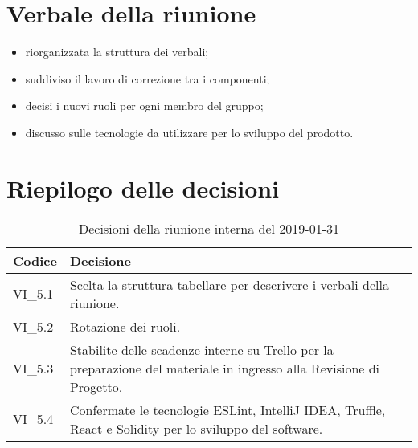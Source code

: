 \section{Verbale della riunione}
\begin{itemize}
	\item riorganizzata la struttura dei verbali;
	\item suddiviso il lavoro di correzione tra i componenti;
	\item decisi i nuovi ruoli per ogni membro del gruppo;
	\item discusso sulle tecnologie da utilizzare per lo sviluppo del prodotto.
\end{itemize}

\hspace{3cm}

\section{Riepilogo delle decisioni}

	
	\begin{longtable}{ >{\centering}p{} >{}p{}}
		\caption{Decisioni della riunione interna del 2019-01-31}\\	
		\rowcolorhead
		\textbf{\color{white}Codice} 
		& \centering\textbf{\color{white}Decisione} 
		\tabularnewline 
		\endfirsthead
		VI\_5.1 & Scelta la struttura tabellare per descrivere i verbali della riunione.
		
		\tabularnewline 
		VI\_5.2 & Rotazione dei ruoli.
		
		\tabularnewline 
		VI\_5.3 & Stabilite delle scadenze interne su Trello per la preparazione del 
					materiale in ingresso alla Revisione di Progetto.
		
		\tabularnewline 
		VI\_5.4 & Confermate le tecnologie ESLint, IntelliJ IDEA, Truffle, React e Solidity
					per lo sviluppo del software.
		
		
	\end{longtable}
	




